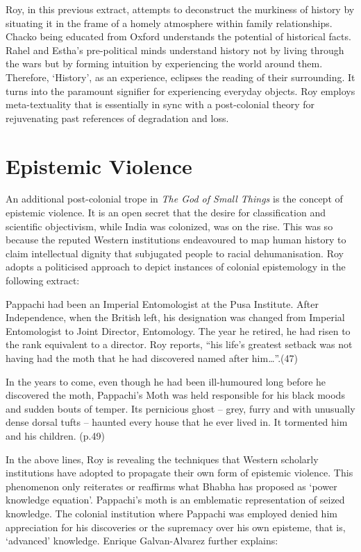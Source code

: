 Roy, in this previous extract, attempts to deconstruct the murkiness of history by situating it in the frame of a homely atmosphere within family relationships. Chacko being educated from Oxford understands the potential of historical facts. Rahel and Estha’s pre-political minds understand history not by living through the wars but by forming intuition by experiencing the world around them.  Therefore, ‘History’, as an experience, eclipses the reading of their surrounding. It turns into the paramount signifier for experiencing everyday objects. Roy employs meta-textuality that is essentially in sync with a post-colonial theory for rejuvenating past references of degradation and loss. 

\section{Epistemic Violence}

An additional post-colonial trope in \emph{The God of Small Things} is the concept of epistemic violence. It is an open secret that the desire for classification and scientific objectivism, while India was colonized, was on the rise. This was so because the reputed Western institutions endeavoured to map human history to claim intellectual dignity that subjugated people to racial dehumanisation. Roy adopts a politicised approach to depict instances of colonial epistemology in the following extract:

Pappachi had been an Imperial Entomologist at the Pusa Institute. After Independence, when the British left, his designation was changed from Imperial Entomologist to Joint Director, Entomology. The year he retired, he had risen to the rank equivalent to a director. Roy reports, “his life’s greatest setback was not having had the moth that he had discovered named after him…”.(47)

In the years to come, even though he had been ill-humoured long before he discovered the moth, Pappachi’s Moth was held responsible for his black moods and sudden bouts of temper. Its pernicious ghost – grey, furry and with unusually dense dorsal tufts – haunted every house that he ever lived in. It tormented him and his children. (p.49) 

In the above lines, Roy is revealing the techniques that Western scholarly institutions have adopted to propagate their own form of epistemic violence. This phenomenon only reiterates or reaffirms what Bhabha has proposed as ‘power knowledge equation’. Pappachi’s moth is an emblematic representation of seized knowledge. The colonial institution where Pappachi was employed denied him appreciation for his discoveries or the supremacy over his own episteme, that is, ‘advanced’ knowledge. Enrique Galvan-Alvarez further explains: 


